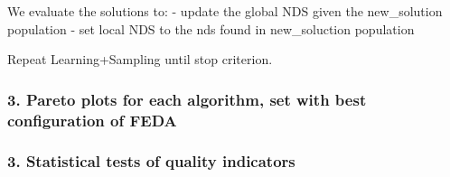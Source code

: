 \documentclass[11pt]{article}
\begin{document}
We evaluate the solutions to: - update the global NDS given the
new\_solution population - set local NDS to the nds found in
new\_soluction population

Repeat Learning+Sampling until stop criterion.

    \subsubsection{3. Pareto plots for each algorithm, set with best
configuration of
FEDA}\label{pareto-plots-for-each-algorithm-set-with-best-configuration-of-feda}

    \subsubsection{3. Statistical tests of quality
indicators}\label{statistical-tests-of-quality-indicators}


    
    
    
\end{document}

